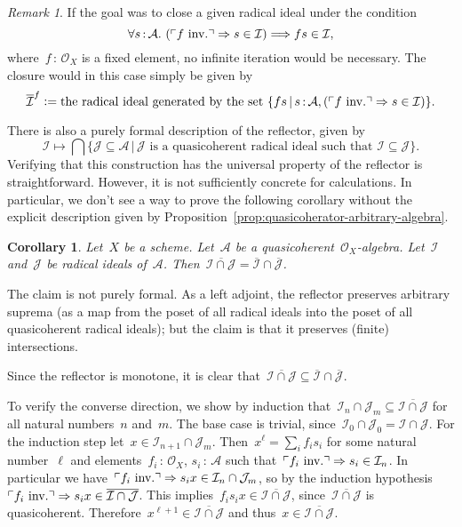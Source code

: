 \documentclass[10pt,reqno,a4paper]{amsbook}
\makeatletter
\theoremstyle{definition}
\theoremstyle{plain}
\newtheorem{cor}[defn]{Corollary}
\theoremstyle{remark}
\newtheorem{rem}[defn]{Remark}
\newcommand{\A}{\mathcal{A}}
\renewcommand{\O}{\mathcal{O}}
\newcommand{\I}{\mathcal{I}}
\newcommand{\J}{\mathcal{J}}
\newcommand{\?}{\,{:}\,}
\renewcommand{\_}{\mathpunct{.}\,}
\newcommand{\speak}[1]{\ulcorner\text{\textnormal{#1}}\urcorner}
\newcommand{\inv}{inv.\@}
\newcommand{\defeq}{\vcentcolon=}
\renewenvironment{proof}[1][\proofname]{\par
  \pushQED{\qed}%
  \normalfont \topsep6\p@\@plus6\p@\relax
  \trivlist
  \item[\hskip\labelsep
        \itshape
    #1\@addpunct{.}]\ignorespaces
}{%
  \popQED\endtrivlist\@endpefalse
}
\makeatother
\begin{document}
\begin{rem}\label{rem:reflector-single-element}
If the goal was to close a given radical ideal under the condition
\[ \forall s\?\A\_ (\speak{$f$ \inv} \Rightarrow s \in \I) \Longrightarrow fs \in \I, \]
where~$f \? \O_X$ is a fixed element, no infinite iteration would be necessary.
The closure would in this case simply be given by
\[ \overline{\I}^f \defeq \text{the radical ideal generated by the set~$\{ fs
\,|\, s \? \A, (\speak{$f$ \inv} \Rightarrow s \in \I) \}$}. \]\end{rem}

There is also a purely formal description of the reflector, given by
\[ \I \longmapsto \bigcap \{ \J \subseteq \A \,|\,
  \text{$\J$ is a quasicoherent radical ideal such that~$\I \subseteq \J$} \}. \]
Verifying that this construction has the universal property of
the reflector is straightforward. However, it is not sufficiently concrete for
calculations. In particular, we don't see a way to prove the following
corollary without the explicit description given by
Proposition~\ref{prop:quasicoherator-arbitrary-algebra}.

\begin{cor}\label{cor:quasicoherator-meet}
Let~$X$ be a scheme. Let~$\A$ be a quasicoherent~$\O_X$-algebra. Let~$\I$
and~$\J$ be radical ideals of~$\A$. Then~$\overline{\I \cap \J} =
\overline{\I} \cap \overline{\J}$.
\end{cor}
\begin{proof}The claim is not purely formal. As a left adjoint, the reflector
preserves arbitrary suprema (as a map from the poset of all radical ideals into the poset
of all quasicoherent radical ideals); but the claim is that it preserves (finite) intersections.

Since the reflector is monotone, it is clear that~$\overline{\I
\cap \J} \subseteq \overline{\I} \cap \overline{\J}$.

To verify the converse
direction, we show by induction that~$\I_n \cap \J_m \subseteq \overline{\I
\cap \J}$ for all natural numbers~$n$ and~$m$. The base case is trivial,
since~$\I_0 \cap \J_0 = \I \cap \J$. For the induction step let~$x \in \I_{n+1}
\cap \J_m$. Then~$x^\ell = \sum_i f_i s_i$ for some natural number~$\ell$ and
elements~$f_i \? \O_X$, $s_i \? \A$ such that~$\speak{$f_i$ \inv} \Rightarrow
s_i \in \I_n$. In particular we have~$\speak{$f_i$ \inv} \Rightarrow s_i x \in
\I_n \cap \J_m$, so by the induction hypothesis~$\speak{$f_i$ \inv} \Rightarrow
s_i x \in \overline{\I \cap \J}$. This implies~$f_i s_i x \in \overline{\I \cap
\J}$, since~$\overline{\I \cap \J}$ is quasicoherent. Therefore~$x^{\ell+1} \in
\overline{\I \cap \J}$ and thus~$x \in \overline{\I \cap \J}$.
\end{proof}
\end{document}
